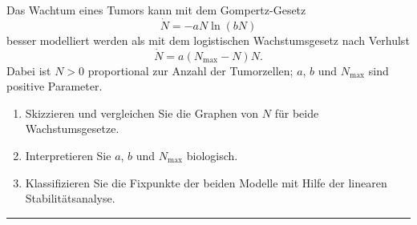 \documentclass[11pt,a4paper]{article}
\begin{document}
\bigskip%

\begin{aufg}
 Das Wachtum eines Tumors kann mit dem Gompertz-Gesetz
 \begin{equation*}
  \dot{N} = - a N \ln(bN)
 \end{equation*}
 besser modelliert werden als mit dem logistischen Wachstumsgesetz nach Verhulst
  \begin{equation*}
  \dot{N} = a(N_{\max}-N) N.
 \end{equation*}
 Dabei ist $N>0$ proportional zur Anzahl der Tumorzellen;
 $a$, $b$ und $N_{\max}$ sind positive Parameter.
 \begin{enumerate}
  \item Skizzieren und vergleichen Sie die Graphen von $N$ für beide Wachstumsgesetze.
  \item Interpretieren Sie $a$, $b$ und $N_{\max}$ biologisch.
  \item Klassifizieren Sie die Fixpunkte der beiden Modelle mit Hilfe der
        linearen Stabilitätsanalyse.
 \end{enumerate}
\end{aufg}


\bigskip
\hrule

\end{document}
